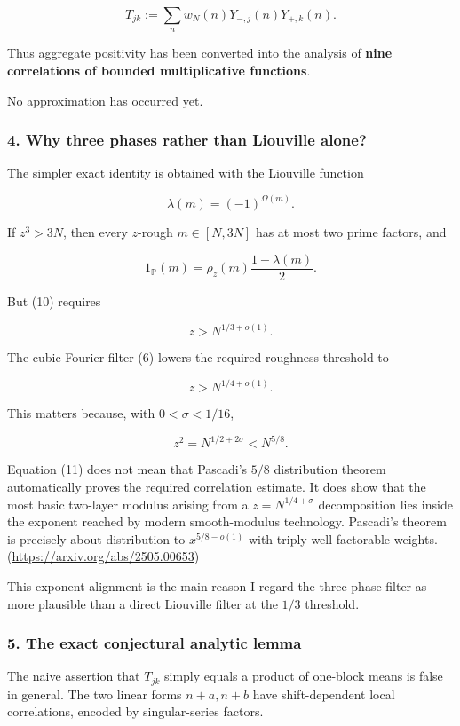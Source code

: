 \[
T_{jk}
:=
\sum_n w_N(n)Y_{-,j}(n)Y_{+,k}(n).
\tag{9}
\]

Thus aggregate positivity has been converted into the analysis of \textbf{nine correlations of bounded multiplicative functions}.

No approximation has occurred yet.

\medskip
\medskip


\subsubsection*{4. Why three phases rather than Liouville alone?}

The simpler exact identity is obtained with the Liouville function

\[
\lambda(m)=(-1)^{\Omega(m)}.
\]

If \(z^3>3N\), then every \(z\)-rough \(m\in[N,3N]\) has at most two prime factors, and

\[
1_{\mathbb P}(m)
=
\rho_z(m)\frac{1-\lambda(m)}2.
\tag{10}
\]

But (10) requires

\[
z>N^{1/3+o(1)}.
\]

The cubic Fourier filter (6) lowers the required roughness threshold to

\[
z>N^{1/4+o(1)}.
\]

This matters because, with \(0<\sigma<1/16\),

\[
z^2=N^{1/2+2\sigma}<N^{5/8}.
\tag{11}
\]

Equation (11) does not mean that Pascadi’s \(5/8\) distribution theorem automatically proves the required correlation estimate. It does show that the most basic two-layer modulus arising from a \(z=N^{1/4+\sigma}\) decomposition lies inside the exponent reached by modern smooth-modulus technology. Pascadi’s theorem is precisely about distribution to \(x^{5/8-o(1)}\) with triply-well-factorable weights. (\url{https://arxiv.org/abs/2505.00653})

This exponent alignment is the main reason I regard the three-phase filter as more plausible than a direct Liouville filter at the \(1/3\) threshold.

\medskip
\medskip


\subsubsection*{5. The exact conjectural analytic lemma}

The naive assertion that \(T_{jk}\) simply equals a product of one-block means is false in general. The two linear forms \(n+a,n+b\) have shift-dependent local correlations, encoded by singular-series factors.

